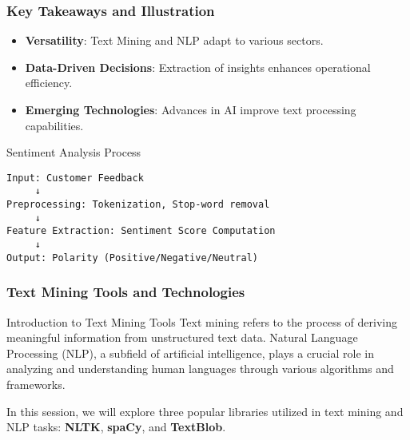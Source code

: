 \documentclass[aspectratio=169]{beamer}
\begin{document}
\begin{frame}[fragile]
    \frametitle{Key Takeaways and Illustration}
    \begin{itemize}
        \item \textbf{Versatility}: Text Mining and NLP adapt to various sectors.
        \item \textbf{Data-Driven Decisions}: Extraction of insights enhances operational efficiency.
        \item \textbf{Emerging Technologies}: Advances in AI improve text processing capabilities.
    \end{itemize}
    
    \begin{block}{Sentiment Analysis Process}
    \begin{lstlisting}
Input: Customer Feedback
     ↓
Preprocessing: Tokenization, Stop-word removal
     ↓
Feature Extraction: Sentiment Score Computation
     ↓
Output: Polarity (Positive/Negative/Neutral)
    \end{lstlisting}
    \end{block}
\end{frame}

\begin{frame}
    \frametitle{Text Mining Tools and Technologies}
    \begin{block}{Introduction to Text Mining Tools}
        Text mining refers to the process of deriving meaningful information from unstructured text data. 
        Natural Language Processing (NLP), a subfield of artificial intelligence, plays a crucial role in analyzing 
        and understanding human languages through various algorithms and frameworks. 

        In this session, we will explore three popular libraries utilized in text mining and NLP tasks:
        \textbf{NLTK}, \textbf{spaCy}, and \textbf{TextBlob}.
    \end{block}
\end{frame}
\end{document}
